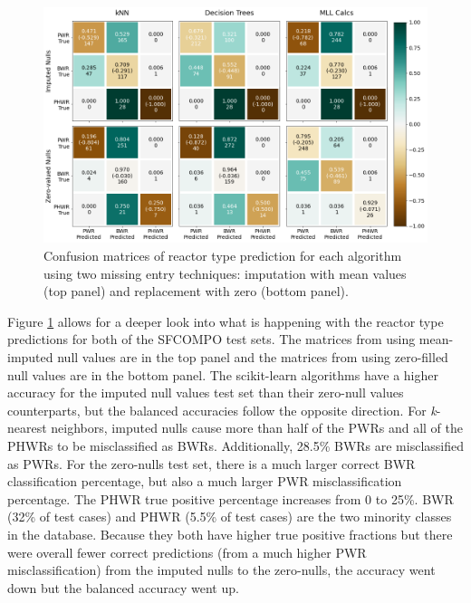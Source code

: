\begin{figure}[!htb]
  \centering
  \includegraphics[width=\textwidth]{./chapters/exp1/confusion_matrix_sfco.png}
  \caption{Confusion matrices of reactor type prediction for each algorithm 
           using two missing entry techniques: imputation with mean values (top 
           panel) and replacement with zero (bottom panel).}
  \label{fig:cm}
\end{figure}

Figure \ref{fig:cm} allows for a deeper look into what is happening with the
reactor type predictions for both of the \gls{SFCOMPO} test sets.  The matrices
from using mean-imputed null values are in the top panel and the matrices from
using zero-filled null values are in the bottom panel.  The scikit-learn
algorithms have a higher accuracy for the imputed null values test set than
their zero-null values counterparts, but the balanced accuracies follow the
opposite direction. For \textit{k}-nearest neighbors, imputed nulls cause more
than half of the \gls{PWR}s and all of the \gls{PHWR}s to be misclassified as
\gls{BWR}s. Additionally, 28.5\% \gls{BWR}s are misclassified as \gls{PWR}s.
For the zero-nulls test set, there is a much larger correct \gls{BWR}
classification percentage, but also a much larger \gls{PWR} misclassification
percentage. The \gls{PHWR} true positive percentage increases from 0 to 25\%.
\Gls{BWR} (32\% of test cases) and \gls{PHWR} (5.5\% of test cases) are the two
minority classes in the database.  Because they both have higher true positive
fractions but there were overall fewer correct predictions (from a much higher
\gls{PWR} misclassification) from the imputed nulls to the zero-nulls, the
accuracy went down but the balanced accuracy went up.

